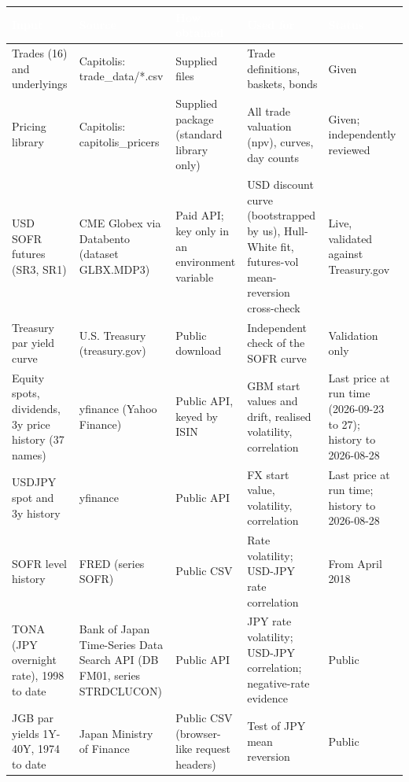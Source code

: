 \documentclass[11pt,letterpaper]{article}
\begin{document}
{\scriptsize\setlength{\LTpre}{4pt}\setlength{\LTpost}{6pt}
\begin{longtable}{>{\raggedright\arraybackslash}p{}>{\raggedright\arraybackslash}p{}>{\raggedright\arraybackslash}p{}>{\raggedright\arraybackslash}p{}>{\raggedright\arraybackslash}p{}}
\toprule
\rowcolor{navy}\textbf{\textcolor{white}{Input}} & \textbf{\textcolor{white}{Source}} & \textbf{\textcolor{white}{How obtained}} & \textbf{\textcolor{white}{Used for}} & \textbf{\textcolor{white}{Status}} \\
\endhead
Trades (16) and underlyings & Capitolis: trade\_data/*.csv & Supplied files & Trade definitions, baskets, bonds & Given \\
\rowcolor{gray!9}Pricing library & Capitolis: capitolis\_pricers & Supplied package (standard library only) & All trade valuation (npv), curves, day counts & Given; independently reviewed \\
USD SOFR futures (SR3, SR1) & CME Globex via Databento (dataset GLBX.MDP3) & Paid API; key only in an environment variable & USD discount curve (bootstrapped by us), Hull-White fit, futures-vol mean-reversion cross-check & Live, validated against Treasury.gov \\
\rowcolor{gray!9}Treasury par yield curve & U.S. Treasury (treasury.gov) & Public download & Independent check of the SOFR curve & Validation only \\
Equity spots, dividends, 3y price history (37 names) & yfinance (Yahoo Finance) & Public API, keyed by ISIN & GBM start values and drift, realised volatility, correlation & Last price at run time (2026-09-23 to 27); history to 2026-08-28 \\
\rowcolor{gray!9}USDJPY spot and 3y history & yfinance & Public API & FX start value, volatility, correlation & Last price at run time; history to 2026-08-28 \\
SOFR level history & FRED (series SOFR) & Public CSV & Rate volatility; USD-JPY rate correlation & From April 2018 \\
\rowcolor{gray!9}TONA (JPY overnight rate), 1998 to date & Bank of Japan Time-Series Data Search API (DB FM01, series STRDCLUCON) & Public API & JPY rate volatility; USD-JPY correlation; negative-rate evidence & Public \\
JGB par yields 1Y-40Y, 1974 to date & Japan Ministry of Finance & Public CSV (browser-like request headers) & Test of JPY mean reversion & Public \\

\end{longtable}}
\end{document}
